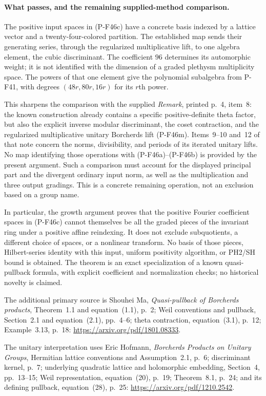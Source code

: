 \documentclass[11pt,a4paper]{article}
\begin{document}
\paragraph{What passes, and the remaining supplied-method comparison.}
The positive input spaces in (P-F46c) have a concrete
basis indexed by a lattice vector and a twenty-four-colored
partition. The established map sends their generating
series, through the regularized multiplicative lift,
to one algebra element, the cubic discriminant. The
coefficient $96$ determines its automorphic weight;
it is not identified with the dimension of a graded
plethysm multiplicity space. The powers of that one
element give the polynomial subalgebra from P-F41,
with degrees $(48r,80r,16r)$ for its $r$th power.

This sharpens the comparison with the supplied
\emph{Remark}, printed p.~4, item~8: the known
construction already contains a specific positive-definite
theta factor, but also the explicit inverse modular
discriminant, the coset contraction, and the regularized
multiplicative unitary Borcherds lift (P-F46m). Items~9--10 and~12 of that note
concern the norms, divisibility, and periods of its
iterated unitary lifts. No map identifying those
operations with (P-F46a)--(P-F46b) is provided by the
present argument. Such a comparison must account for
the displayed principal part and the divergent ordinary
input norm, as well as the multiplication and three
output gradings. This is a concrete remaining operation,
not an exclusion based on a group name.

In particular, the growth argument proves that the
positive Fourier coefficient spaces in (P-F46c) cannot
themselves be all the graded pieces of the invariant
ring under a positive affine reindexing. It does not
exclude subquotients, a different choice of spaces,
or a nonlinear transform. No basis
of those pieces, Hilbert-series identity with this
input, uniform positivity algorithm, or PH2/SH bound
is obtained. The theorem is an exact specialization of
a known quasi-pullback formula, with explicit coefficient
and normalization checks; no historical novelty is claimed.

The additional primary source is Shouhei Ma,
\emph{Quasi-pullback of Borcherds products},
Theorem~1.1 and equation~(1.1), p.~2; Weil conventions
and pullback, Section~2.1 and equation~(2.1), pp.~4--6;
theta contraction, equation~(3.1), p.~12; Example~3.13,
p.~18:
\url{https://arxiv.org/pdf/1801.08333}.

The unitary interpretation uses Eric Hofmann,
\emph{Borcherds Products on Unitary Groups},
Hermitian lattice conventions and Assumption~2.1, p.~6;
discriminant kernel, p.~7; underlying quadratic lattice
and holomorphic embedding, Section~4, pp.~13--15;
Weil representation, equation~(20), p.~19;
Theorem~8.1, p.~24; and its defining pullback,
equation~(28), p.~25:
\url{https://arxiv.org/pdf/1210.2542}.
\end{document}
